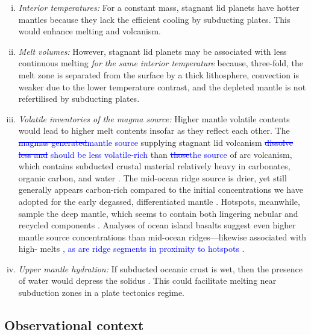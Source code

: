 \documentclass[3p,authoryear]{elsarticle}
\newcommand{\editthree}[2]{\textcolor{blue}{\sout{#1}#2}}
\begin{document}
\begin{enumerate}[i.]

\item \textit{Interior temperatures:} For a constant mass, stagnant lid planets have hotter mantles because they lack the efficient cooling by subducting plates. This would enhance melting and volcanism.

\item \textit{Melt volumes:} However, stagnant lid planets may be associated with less continuous melting \textit{for the same interior temperature} because, three-fold, the melt zone is separated from the surface by a thick lithosphere, convection is weaker due to the lower temperature contrast, and the depleted mantle is not refertilised by subducting plates.

\item \textit{Volatile inventories of the magma source:} Higher mantle volatile contents would lead to higher melt contents insofar as they reflect each other. The \editthree{magmas generated}{mantle source} supplying stagnant lid volcanism \editthree{dissolve less  and }{should be less volatile-rich} than \editthree{those}{the source} of arc volcanism, which contains subducted crustal material relatively heavy in carbonates, organic carbon, and water \citep{WALLACE2005}. The mid-ocean ridge source is drier, yet still generally appears carbon-rich compared to the initial concentrations we have adopted for the early degassed, differentiated mantle \citep{Hauri2019}. Hotspots, meanwhile, sample the deep mantle, which seems to contain both lingering nebular and recycled components \citep[e.g.,][]{MILLER2019}. Analyses of ocean island basalts suggest even higher mantle source concentrations than mid-ocean ridges---likewise associated with high- melts \citep[e.g.,][]{SHORTTLE2015, TUCKER2019, Broadley2019, MILLER2019}\editthree{}{, as are ridge segments in proximity to hotspots \citep{Voyer2019}}.  

\item \textit{Upper mantle hydration:} If subducted oceanic crust is wet, then the presence of water would depress the solidus \citep{Katz2003}. This could facilitate melting near subduction zones in a plate tectonics regime.
\end{enumerate}


\subsection{Observational context}
\end{document}
